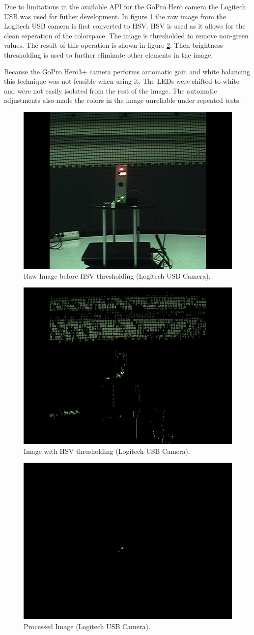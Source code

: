 \documentclass[botnum, fleqn]{unmeethesis}
\begin{document}
Due to limitations in the available API for the GoPro Hero camera the Logitech USB was used for futher development. In figure \ref{fig:orig} the raw image from the Logitech USB camera is first converted to HSV. HSV is used as it allows for the clean seperation of the colorspace. The image is thresholded to remove non-green values. The result of this operation is shown in figure \ref{fig:hsvMasked}. Then brightness thresholding is used to further eliminate other elements in the image. 

Because the GoPro Hero3+ camera performs automatic gain and white balancing this technique was not feasible when using it. The LEDs were shifted to white and were not easily isolated from the rest of the image. The automatic adjustments also made the colors in the image unreliable under repeated tests.
\clearpage

\begin{figure}[ht]
 \begin{center}
  \includegraphics[width=0.36 \textwidth]{figures/original.png}
  \caption{\small \label{fig:orig} Raw Image before HSV thresholding (Logitech USB Camera).}
 \end{center}
\end{figure}

\begin{figure}[htb]
 \begin{center}
  \includegraphics[width=0.36 \textwidth]{figures/hsvmasked.png}
  \caption{\small \label{fig:hsvMasked} Image with HSV thresholding (Logitech USB Camera).}
 \end{center}
\end{figure}

\begin{figure}[htb]
 \begin{center}
  \includegraphics[width=0.36 \textwidth]{figures/hsvThreshAndMask.png}
  \caption{\small \label{fig:Procced} Processed Image (Logitech USB Camera).}
 \end{center}
\end{figure}
\end{document}
